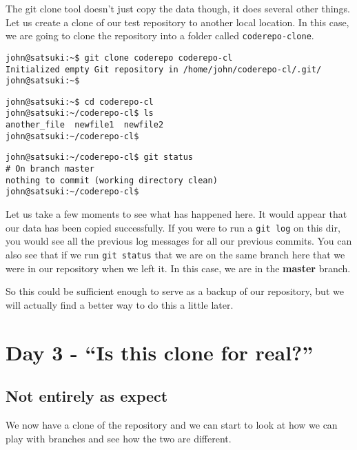 The git clone tool doesn't just copy the data though, it does several other things.  Let us create a clone of our test repository to another local location.  In this case, we are going to clone the repository into a folder called \texttt{coderepo-clone}.

\begin{Verbatim}[frame=leftline,framerule=1mm,fontsize=\relsize{-3}] 
john@satsuki:~$ git clone coderepo coderepo-cl
Initialized empty Git repository in /home/john/coderepo-cl/.git/
john@satsuki:~$ 
\end{Verbatim}

\begin{Verbatim}[frame=leftline,framerule=1mm,fontsize=\relsize{-3}] 
john@satsuki:~$ cd coderepo-cl
john@satsuki:~/coderepo-cl$ ls 
another_file  newfile1  newfile2
john@satsuki:~/coderepo-cl$
\end{Verbatim}

\begin{Verbatim}[frame=leftline,framerule=1mm,fontsize=\relsize{-3}] 
john@satsuki:~/coderepo-cl$ git status
# On branch master
nothing to commit (working directory clean)
john@satsuki:~/coderepo-cl$ 
\end{Verbatim}

Let us take a few moments to see what has happened here.  It would appear that our data has been copied successfully.  If you were to run a \texttt{git log} on this dir, you would see all the previous log messages for all our previous commits.  You can also see that if we run \texttt{git status} that we are on the same branch here that we were in our repository when we left it.  In this case, we are in the \textbf{master} branch.

So this could be sufficient enough to serve as a backup of our repository, but we will actually find a better way to do this a little later.

\section{Day 3 - ``Is this clone for real?''}
\subsection{Not entirely as expect}

We now have a clone of the repository and we can start to look at how we can play with branches and see how the two are different.

